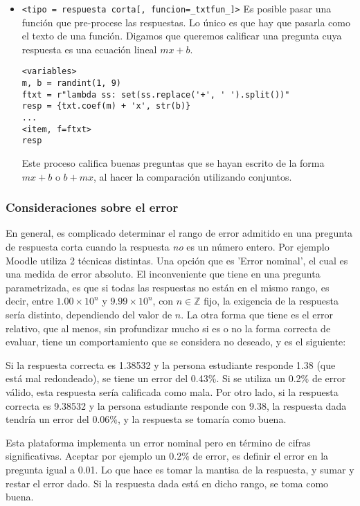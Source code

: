 \documentclass[12pt]{article}
\theoremstyle{definition}
\begin{document}
\begin{itemize}
\begin{verbatim}
<item>
alfa
\end{verbatim}

Cuando se est\'a calificando la prueba, y el sistema encuentre un valor de \verb|math.nan| en la respuesta dada por el sistema, entonces el sistema pone buena la pregunta.

\item \verb|<tipo = respuesta corta[, funcion=_txtfun_]>|
Es posible pasar una funci\'on que pre-procese las respuestas. Lo \'unico es que hay que pasarla como el texto de una funci\'on. Digamos que queremos calificar una pregunta cuya respuesta es una ecuaci\'on lineal $mx+b$.
\begin{verbatim}
<variables>
m, b = randint(1, 9)
ftxt = r"lambda ss: set(ss.replace('+', ' ').split())"
resp = {txt.coef(m) + 'x', str(b)}
...
<item, f=ftxt>
resp
\end{verbatim}
Este proceso califica buenas preguntas que se hayan escrito de la forma $mx+b$ o $b+mx$, al hacer la comparaci\'on utilizando conjuntos.
\end{itemize}

\subsubsection{Consideraciones sobre el error}
En general, es complicado determinar el rango de error admitido en una pregunta de respuesta corta cuando la respuesta \emph{no} es un número entero. Por ejemplo Moodle utiliza 2 técnicas distintas. Una opción que es 'Error nominal', el cual es una medida de error absoluto. El inconveniente que tiene en una pregunta parametrizada, es que si todas las respuestas no están en el mismo rango, es decir, entre $1.00\times 10^n$ y $9.99\times 10^n$, con $n\in\mathbb Z$ fijo, la exigencia de la respuesta sería distinto, dependiendo del valor de $n$. La otra forma que tiene es el error relativo, que al menos, sin profundizar mucho si es o no la forma correcta de evaluar, tiene un comportamiento que se considera no deseado, y es el siguiente:

Si la respuesta correcta es 1.38532 y la persona estudiante responde 1.38 (que está mal redondeado), se tiene un error del 0.43\%. Si se utiliza un 0.2\% de error válido, esta respuesta sería calificada como mala. Por otro lado, si la respuesta correcta es 9.38532 y la persona estudiante responde con 9.38, la respuesta dada tendría un error del 0.06\%, y la respuesta se tomaría como buena.

Esta plataforma implementa un error nominal pero en término de cifras significativas. Aceptar por ejemplo un 0.2\% de error, es definir el error en la pregunta igual a 0.01. Lo que hace es tomar la mantisa de la respuesta, y sumar y restar el error dado. Si la respuesta dada está en dicho rango, se toma como buena.
\end{document}
